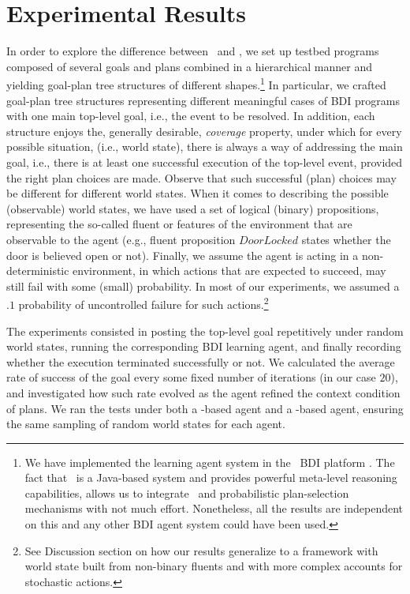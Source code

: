 \section{Experimental Results}\label{sec:experiments}



In order to explore the difference between \BUL\ and \CL, we set up testbed
programs composed of several goals and plans combined in a hierarchical manner
and yielding goal-plan tree structures of different shapes.\footnote{We have
implemented the learning agent system in the \JACK\ BDI platform
\cite{Busetta99jack}. The fact that \JACK\ is a Java-based system and
provides powerful meta-level reasoning capabilities, allows us to integrate \weka\ and
probabilistic plan-selection mechanisms with not much effort. Nonetheless, all
the results are independent on this and any other BDI agent system could
have been used.}
In particular, we crafted goal-plan tree structures representing different
meaningful cases of BDI programs with one main top-level goal, i.e., the event to
be resolved. In addition, each structure enjoys the, generally desirable,
\emph{coverage} property, under which for every possible situation, (i.e., world
state), there is always a way of addressing the main goal, i.e., there is at
least one successful execution of the top-level event, provided the right plan
choices are made. Observe that such successful (plan) choices may be different
for different world states.
When it comes to describing the possible (observable) world states, we have used
a set of logical (binary) propositions, representing the so-called fluent or
features of the environment that are observable to the agent (e.g., fluent
proposition $\mathit{DoorLocked}$ states whether the door is believed open or
not).
Finally, we assume the agent is acting in a non-deterministic environment, in
which actions that are expected to succeed, may still fail with some (small)
probability. In most of our experiments, we assumed a $.1$ probability of
uncontrolled failure for such actions.\footnote{See Discussion section on how our
results generalize to a framework with world state built from non-binary fluents
and with more complex accounts for stochastic actions.}




The experiments consisted in posting the top-level goal repetitively under random
world states, running the corresponding  BDI learning agent, and finally
recording whether the execution terminated successfully or not.
We calculated the average rate of success of the goal every some fixed
number of iterations (in our case $20$), and investigated how such rate evolved
as the agent refined the context condition of plans.
We ran the tests under both a \BUL-based agent and a \CL-based agent,
ensuring the same sampling of random world states for each agent.

